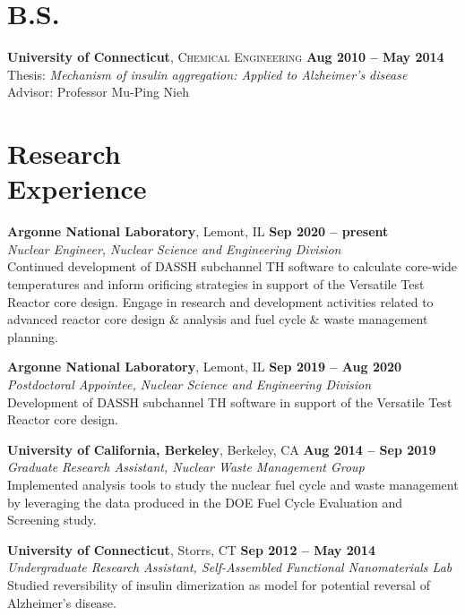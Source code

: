 \documentclass[margin,line]{resume}
\begin{document}
\begin{resume}
\section{\mysidestyle B.S.}
    \textbf{University of Connecticut}, 
    \textsc{Chemical Engineering} \hfill 
    \textbf{Aug 2010 -- May 2014} \vspace{1 mm} \\
    Thesis: \textsl{Mechanism of insulin aggregation: Applied to Alzheimer’s disease} \\
    Advisor: Professor Mu-Ping Nieh \\
\section{\mysidestyle Research \\ Experience}

\textbf{Argonne National Laboratory}, Lemont, IL \hfill
    \textbf{Sep 2020 -- present} \\
\textsl{Nuclear Engineer, Nuclear Science and Engineering Division} \\
Continued development of DASSH subchannel TH software to calculate core-wide temperatures and inform orificing strategies in support of the Versatile Test Reactor core design. Engage in research and development activities related to advanced reactor core design \& analysis and fuel cycle \& waste management planning.

\textbf{Argonne National Laboratory}, Lemont, IL \hfill
    \textbf{Sep 2019 -- Aug 2020} \\
\textsl{Postdoctoral Appointee, Nuclear Science and Engineering Division} \\
Development of DASSH subchannel TH software in support of the Versatile Test Reactor core design.

\textbf{University of California, Berkeley}, Berkeley, CA \hfill 
    \textbf{Aug 2014 -- Sep 2019 } \\
\textsl{Graduate Research Assistant, Nuclear Waste Management Group} \\
Implemented analysis tools to study the nuclear fuel cycle and waste management by leveraging the data produced in the DOE Fuel Cycle Evaluation and Screening study.

\textbf{University of Connecticut}, Storrs, CT \hfill 
    \textbf{Sep 2012 -- May 2014} \\
\textsl{Undergraduate Research Assistant, Self-Assembled Functional Nanomaterials Lab} \\
Studied reversibility of insulin dimerization as model for potential reversal of Alzheimer's disease.


\end{resume}
\end{document}
